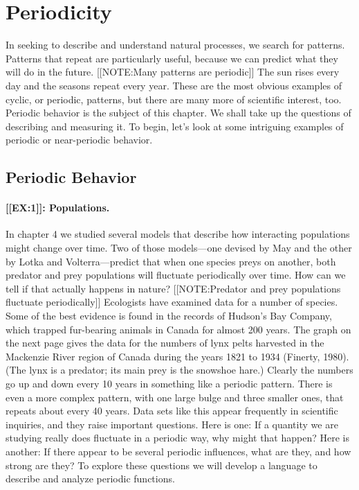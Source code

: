 

\chapter{Periodicity}
\label{chap:periodicity}

In seeking to describe and understand natural processes, we search for
patterns.  Patterns that repeat are particularly useful, because we
can predict what they will do in the future.
[[NOTE:Many patterns  are periodic]]	
The sun rises every day and the seasons repeat every year. These are
the most obvious examples of cyclic, or periodic, patterns, but there
are many more of scientific interest, too.  Periodic
behavior is the subject of this chapter.  We
shall take up the questions of describing and measuring it.  To begin,
let's look at some intriguing examples of periodic or near-periodic
behavior.

\section{Periodic Behavior}
\label{sec:periodic-behavior}


\subsubsection{[[EX:1]]: Populations.}
In chapter 4 we studied several models
that describe how interacting populations might change over time.  Two
of those models---one devised by May and the other by Lotka
and Volterra---predict that when one
species preys on another, both predator and prey populations will
fluctuate periodically over time.  How can we tell if that actually
happens in nature?
[[NOTE:Predator and  prey populations  fluctuate periodically]]
Ecologists have examined data for a number of species.  Some of the
best evidence is found in the records of Hudson's Bay
Company, which trapped fur-bearing animals
in Canada for almost 200 years.  The graph on the next page gives the
data for the numbers of lynx pelts harvested in the
Mackenzie River region of Canada during the years 1821 to 1934
(Finerty, 1980).  (The lynx is a predator; its main
prey is the snowshoe hare.)  Clearly the numbers go up and down every
10 years in something like a periodic pattern.  There is even a more
complex pattern, with one large bulge and three smaller ones, that
repeats about every 40 years.  Data sets like this appear frequently
in scientific inquiries, and they raise important questions.  Here is
one: If a quantity we are studying really does fluctuate in a
periodic way, why might that happen?  Here is another:
If there appear to be several periodic influences, what are they, and
how strong are they?  To explore these questions we will develop a
language to describe and analyze periodic functions.

